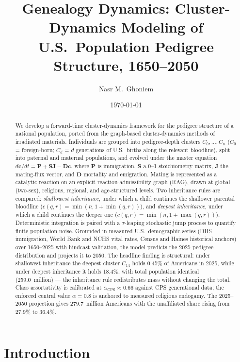 \documentclass[11pt,a4paper]{article}
\title{Genealogy Dynamics: Cluster-Dynamics Modeling of U.S.\
Population Pedigree Structure, 1650--2050}
\author{Nasr M.\ Ghoniem}
\date{\today}
\begin{document}
\maketitle

\begin{abstract}
We develop a forward-time cluster-dynamics framework for the pedigree
structure of a national population, ported from the graph-based
cluster-dynamics methods of irradiated materials.  Individuals are grouped
into pedigree-depth clusters $C_0,\dots,C_n$ ($C_0$ = foreign-born;
$C_d$ = $d$ generations of U.S.\ births along the relevant bloodline),
split into paternal and maternal populations, and evolved under the
master equation $d\mathbf{c}/dt=\mathbf{P}+\mathbf{SJ}-\mathbf{Dc}$,
where $\mathbf{P}$ is immigration, $\mathbf{S}$ a 0--1 stoichiometry
matrix, $\mathbf{J}$ the mating-flux vector, and $\mathbf{D}$ mortality
and emigration.  Mating is represented as a catalytic reaction on an
explicit reaction-admissibility graph (RAG), drawn at global (two-sex),
religious, regional, and age-structured levels.  Two inheritance rules
are compared: \emph{shallowest inheritance}, under which a child
continues the shallower parental bloodline
($c(q,r)=\min(n,1+\min(q,r))$), and \emph{deepest inheritance}, under
which a child continues the deeper one
($c(q,r)=\min(n,1+\max(q,r))$).  Deterministic integration is paired
with a $\tau$-leaping stochastic jump process to quantify finite-population
noise.  Grounded in measured U.S.\ demographic series (DHS immigration,
World Bank and NCHS vital rates, Census and Haines historical anchors)
over 1650--2025 with hindcast validation, the model predicts the 2025
pedigree distribution and projects it to 2050.  The headline finding is
structural: under shallowest inheritance the deepest cluster $C_{14}$
holds 0.45\% of Americans in 2025, while under deepest inheritance it
holds 18.4\%, with total population identical (259.0~million) --- the
inheritance rule redistributes mass without changing the total.  Class
assortativity is calibrated at $\alpha_{\mathrm{CPS}}\approx0.66$
against CPS generational data; the enforced central value $\alpha=0.8$
is anchored to measured religious endogamy.  The 2025--2050 projection
gives 279.7~million Americans with the unaffiliated share rising from
27.9\% to 36.4\%.
\end{abstract}

\tableofcontents
\newpage

\section{Introduction}
\end{document}

